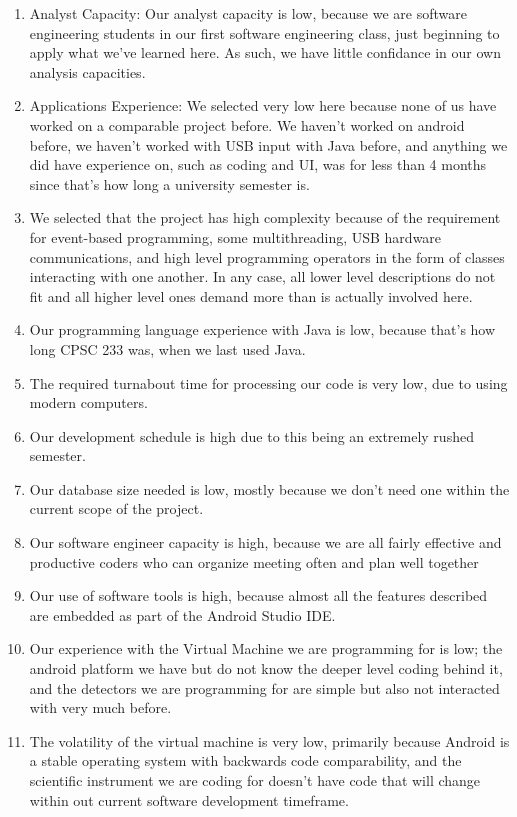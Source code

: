 \documentclass[11pt,a4paper]{article}
\begin{document}
\begin{enumerate}
\item Analyst Capacity: Our analyst capacity is low, because we are software engineering students in our first software engineering class, just beginning to apply what we've learned here. As such, we have little confidance in our own analysis capacities.
\item Applications Experience: We selected very low here because none of us have worked on a comparable project before. We haven't worked on android before, we haven't worked with USB input with Java before, and anything we did have experience on, such as coding and UI, was for less than 4 months since that's how long a university semester is.
\item We selected that the project has high complexity because of the requirement for event-based programming, some multithreading, USB hardware communications, and high level programming operators in the form of classes interacting with one another. In any case, all lower level descriptions do not fit and all higher level ones demand more than is actually involved here.
\item Our programming language experience with Java is low, because that's how long CPSC 233 was, when we last used Java.
\item The required turnabout time for processing our code is very low, due to using modern computers.

\item Our development schedule is high due to this being an extremely rushed semester.
\item Our database size needed is low, mostly because we don't need one within the current scope of the project.
\item Our software engineer capacity is high, because we are all fairly effective and productive coders who can organize meeting often and plan well together
\item Our use of software tools is high, because almost all the features described are embedded as part of the Android Studio IDE.
\item Our experience with the Virtual Machine we are programming for is low; the android platform we have but do not know the deeper level coding behind it, and the detectors we are programming for are simple but also not interacted with very much before.
\item The volatility of the virtual machine is very low, primarily because Android is a stable operating system with backwards code comparability, and the scientific instrument we are coding for doesn't have code that will change within out current software development timeframe.
\end{enumerate}
\end{document}
